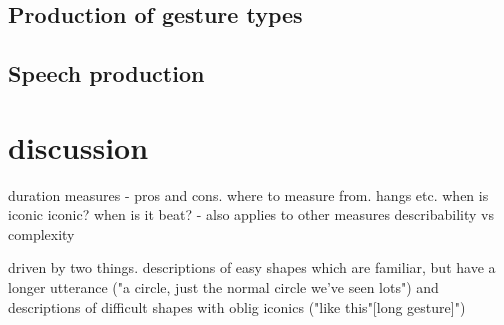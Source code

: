 \documentclass[a4paper,man,natbib]{apa6}
\begin{document}
\subsection{Production of gesture types}


\subsection{Speech production}



\section{discussion}
duration measures - pros and cons.
where to measure from. hangs etc. 
when is iconic iconic? when is it beat? - also applies to other measures 
describability vs complexity

driven by two things.
descriptions of easy shapes which are familiar, but have a longer utterance ("a circle, just the normal circle we've seen lots")
and descriptions of difficult shapes with oblig iconics ("like this"[long gesture]")




\end{document}
